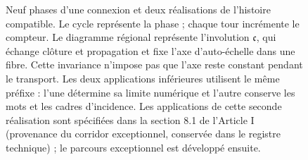 \begin{figure}[!htbp]
\caption{\fontsize{9}{11}\selectfont Neuf phases d'une connexion et deux réalisations de l'histoire
compatible. Le cycle représente la phase ; chaque tour incrémente le compteur.
Le diagramme régional représente l'involution \(\mathfrak c\), qui
échange clôture et propagation et fixe l'axe d'auto-échelle dans une fibre.
Cette invariance n'impose pas que l'axe reste constant pendant le transport.
Les deux applications inférieures utilisent le même préfixe : l'une détermine
sa limite numérique et l'autre conserve les mots et les cadres d'incidence. Les
applications de cette seconde réalisation sont spécifiées dans la section
8.1 de l'Article I (provenance du corridor exceptionnel, conservée dans le registre technique) ; le parcours exceptionnel est développé ensuite.}
\label{mono-ampl:fig-regional}
\end{figure}
